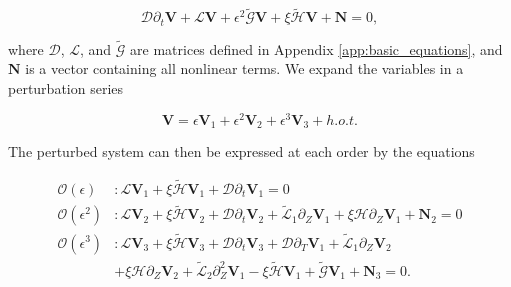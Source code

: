 \documentclass{emulateapj}
\newcommand{\beq}{\begin{equation}}
\newcommand{\eeq}{\end{equation}}
\begin{document}
\beq\label{eq:unperturbed_matrix_eqns}
\mathcal{D}\partial_t\mathbf{V} + \mathcal{L}\mathbf{V} + \epsilon^2 \widetilde{\mathcal{G}} \mathbf{V} + \xi \widetilde{\mathcal{H}} \mathbf{V} +  \mathbf{N} = 0,
\eeq

where $\mathcal{D}$, $\mathcal{L}$, and $\widetilde{\mathcal{G}}$ are matrices defined in Appendix \ref{app:basic_equations}, and $\mathbf{N}$ is a vector containing all nonlinear terms. We expand the variables in a perturbation series 

\beq
\mathbf{V} = \epsilon \mathbf{V}_1 + \epsilon^2 \mathbf{V}_2 + \epsilon^3 \mathbf{V}_3 + h.o.t.
\eeq

 The perturbed system can then be expressed at each order by the equations

\begin{align}
\mathcal{O}(\epsilon)&: \mathcal{L} \mathbf{V}_1 + \xi \widetilde{\mathcal{H}} \mathbf{V}_1 + \mathcal{D} \partial_t \mathbf{V}_1 = 0 \label{eq:ordere}\\
\mathcal{O}(\epsilon^2)&: \mathcal{L} \mathbf{V}_2 + \xi \widetilde{\mathcal{H}} \mathbf{V}_2 + \mathcal{D} \partial_t \mathbf{V}_2 + \widetilde{\mathcal{L}}_1 \partial_Z \mathbf{V}_1 + \xi \mathcal{H} \partial_Z \mathbf{V}_1 + \mathbf{N}_2 = 0 \label{eq:ordere2}\\
\mathcal{O}(\epsilon^3)&: \mathcal{L}\mathbf{V}_3 + \xi \widetilde{\mathcal{H}} \mathbf{V}_3 + \mathcal{D} \partial_t \mathbf{V}_3 + \mathcal{D} \partial_T \mathbf{V}_1 + \widetilde{\mathcal{L}}_1 \partial_Z \mathbf{V}_2\nonumber \\ 
&+ \xi \mathcal{H}\partial_Z \mathbf{V}_2 + \widetilde{\mathcal{L}}_2 \partial_Z^2 \mathbf{V}_1 - \xi \widetilde{\mathcal{H}} \mathbf{V}_1 + \widetilde{\mathcal{G}} \mathbf{V}_1 + \mathbf{N}_3 = 0. \label{eq:ordere3}\\
\end{align}
\end{document}
